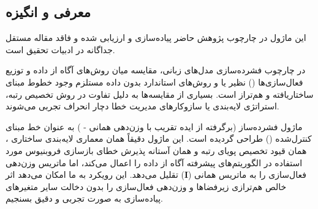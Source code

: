 \subsection{معرفی و انگیزه}
این ماژول در چارچوب پژوهش حاضر پیاده‌سازی و ارزیابی شده و فاقد مقاله مستقل جداگانه در ادبیات تحقیق است.

در چارچوب فشرده‌سازی مدل‌های زبانی، مقایسه میان روش‌های آگاه از داده و توزیع فعال‌سازی‌ها () نظیر  یا  و روش‌های استاندارد بدون داده مستلزم وجود خطوط مبنای ساختاریافته و هم‌تراز است. بسیاری از مقایسه‌ها به دلیل تفاوت در روش تخصیص رتبه، استراتژی لایه‌بندی یا سازوکارهای مدیریت خطا دچار انحراف تجربی می‌شوند.

ماژول فشرده‌ساز  (برگرفته از ایده تقریب با وزن‌دهی همانی - ) به عنوان خط مبنای کنترل‌شده () طراحی گردیده است. این ماژول دقیقاً همان معماری لایه‌بندی ساختاری ، همان قیود تخصیص پویای رتبه و همان آستانه پذیرش خطای بازسازی فروبنیوس مورد استفاده در الگوریتم‌های پیشرفته آگاه از داده را اعمال می‌کند، اما ماتریس وزن‌دهی فعال‌سازی را به ماتریس همانی ($\mathbf{I}$) تقلیل می‌دهد. این رویکرد به ما امکان می‌دهد اثر خالص هم‌ترازی زیرفضاها و وزن‌دهی فعال‌سازی را بدون دخالت سایر متغیرهای پیاده‌سازی به صورت تجربی و دقیق بسنجیم.
